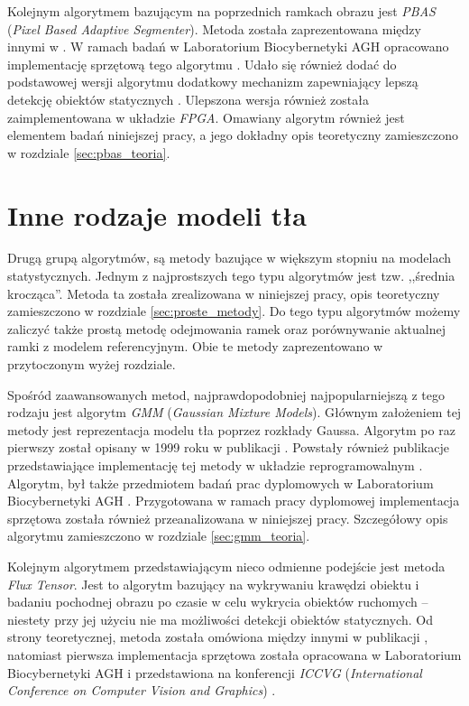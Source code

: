 Kolejnym algorytmem bazującym na poprzednich ramkach obrazu jest \textit{PBAS} (\textit{Pixel Based Adaptive Segmenter}). 
Metoda została zaprezentowana między innymi w \cite{hofmann_12}. 
W ramach badań w Laboratorium Biocybernetyki AGH opracowano implementację sprzętową tego algorytmu \cite{kryjak_13_pbas}. 
Udało się również dodać do podstawowej wersji algorytmu dodatkowy mechanizm zapewniający lepszą detekcję obiektów statycznych \cite{kryjak_14_pbas}. %
Ulepszona wersja również została zaimplementowana w układzie \textit{FPGA}. 
Omawiany algorytm również jest elementem badań niniejszej pracy, a jego dokładny opis teoretyczny zamieszczono w rozdziale \ref{sec:pbas_teoria}.

\section{Inne rodzaje modeli tła}
\label{sec:model_inne}

Drugą grupą algorytmów, są metody bazujące w większym stopniu na modelach statystycznych. Jednym z najprostszych tego typu algorytmów jest tzw. ,,średnia krocząca''. Metoda ta została zrealizowana w niniejszej pracy, opis teoretyczny zamieszczono w rozdziale \ref{sec:proste_metody}. Do tego typu algorytmów możemy zaliczyć także prostą metodę odejmowania ramek oraz porównywanie aktualnej ramki z modelem referencyjnym. Obie te metody zaprezentowano w przytoczonym wyżej rozdziale.
 
Spośród zaawansowanych metod, najprawdopodobniej najpopularniejszą z tego rodzaju jest algorytm \textit{GMM} (\textit{Gaussian Mixture Models}). 
Głównym założeniem tej metody jest reprezentacja modelu tła poprzez rozkłady Gaussa. 
Algorytm po raz pierwszy został opisany w 1999 roku w publikacji \cite{Stauffer_Grimson_99}. 
Powstały również publikacje przedstawiające implementację tej metody w układzie reprogramowalnym \cite{Genovese_Napoli_13}. 
Algorytm, był także przedmiotem badań prac dyplomowych w Laboratorium Biocybernetyki AGH \cite{piszczek_15, janus_15}. 
Przygotowana w ramach pracy dyplomowej \cite{piszczek_15} implementacja sprzętowa została również przeanalizowana w niniejszej pracy.
Szczegółowy opis algorytmu zamieszczono w rozdziale \ref{sec:gmm_teoria}.

Kolejnym algorytmem przedstawiającym nieco odmienne podejście jest metoda \textit{Flux Tensor}. 
Jest to algorytm bazujący na wykrywaniu krawędzi obiektu i badaniu pochodnej obrazu po czasie w celu wykrycia obiektów ruchomych -- niestety przy jej użyciu nie ma możliwości detekcji obiektów statycznych. 
Od strony teoretycznej, metoda została omówiona między innymi w publikacji \cite{palaniappan_11}, natomiast pierwsza implementacja sprzętowa została opracowana w Laboratorium Biocybernetyki AGH i przedstawiona na konferencji \textit{ICCVG} (\textit{International Conference on Computer Vision and Graphics}) \cite{janus_15, janus_16_flux}. %

